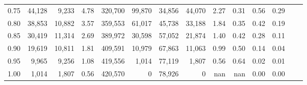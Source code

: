 \begin{tabular}{rrrrrrrrrrrrrr}
0.75 &  44,128 &   9,233 &    4.78 &  320,700 &   99,870 &  34,856 &  44,070 &  2.27 &  0.31 &  0.56 &      0.29 \\
0.80 &  38,853 &  10,882 &    3.57 &  359,553 &   61,017 &  45,738 &  33,188 &  1.84 &  0.35 &  0.42 &      0.19 \\
0.85 &  30,419 &  11,314 &    2.69 &  389,972 &   30,598 &  57,052 &  21,874 &  1.40 &  0.42 &  0.28 &      0.11 \\
0.90 &  19,619 &  10,811 &    1.81 &  409,591 &   10,979 &  67,863 &  11,063 &  0.99 &  0.50 &  0.14 &      0.04 \\
0.95 &   9,965 &   9,256 &    1.08 &  419,556 &    1,014 &  77,119 &   1,807 &  0.56 &  0.64 &  0.02 &      0.01 \\
1.00 &   1,014 &   1,807 &    0.56 &  420,570 &        0 &  78,926 &       0 &   nan &   nan &  0.00 &      0.00 \\
\bottomrule
\end{tabular}
